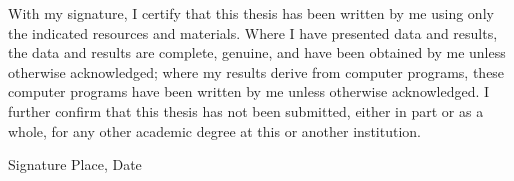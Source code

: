   \newpage  \thispagestyle{empty}  With my signature, I certify that this thesis has been written by me  using only the indicated resources and materials. Where I have  presented data and results, the data and results are complete,  genuine, and have been obtained by me unless otherwise acknowledged;  where my results derive from computer programs, these computer  programs have been written by me unless otherwise acknowledged. I  further confirm that this thesis has not been submitted, either in  part or as a whole, for any other academic degree at this or another  institution. 
  
  \vspace{20mm}  Signature \hfill Place, Date 
